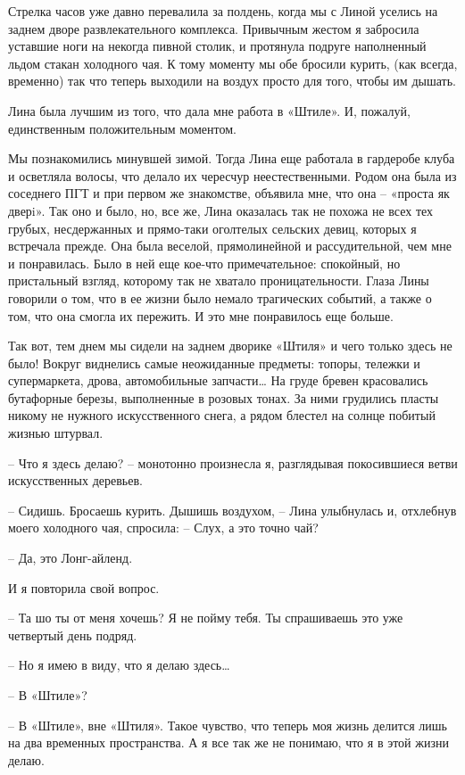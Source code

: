 \documentclass[
]{book}
\begin{document}
Стрелка часов уже давно перевалила за полдень, когда мы с Линой уселись на заднем дворе развлекательного комплекса. Привычным жестом я забросила уставшие ноги на некогда пивной столик, и протянула подруге наполненный льдом стакан холодного чая. К тому моменту мы обе бросили курить, (как всегда, временно) так что теперь выходили на воздух просто для того, чтобы им дышать.

Лина была лучшим из того, что дала мне работа в «Штиле». И, пожалуй, единственным положительным моментом.

Мы познакомились минувшей зимой. Тогда Лина еще работала в гардеробе клуба и осветляла волосы, что делало их чересчур неестественными. Родом она была из соседнего ПГТ и при первом же знакомстве, объявила мне, что она -- «проста як дверi». Так оно и было, но, все же, Лина оказалась так не похожа не всех тех грубых, несдержанных и прямо-таки оголтелых сельских девиц, которых я встречала прежде. Она была веселой, прямолинейной и рассудительной, чем мне и понравилась. Было в ней еще кое-что примечательное: спокойный, но пристальный взгляд, которому так не хватало проницательности. Глаза Лины говорили о том, что в ее жизни было немало трагических событий, а также о том, что она смогла их пережить. И это мне понравилось еще больше.

Так вот, тем днем мы сидели на заднем дворике «Штиля» и чего только здесь не было! Вокруг виднелись самые неожиданные предметы: топоры, тележки и супермаркета, дрова, автомобильные запчасти\ldots{} На груде бревен красовались бутафорные березы, выполненные в розовых тонах. За ними грудились пласты никому не нужного искусственного снега, а рядом блестел на солнце побитый жизнью штурвал.

-- Что я здесь делаю? -- монотонно произнесла я, разглядывая покосившиеся ветви искусственных деревьев.

-- Сидишь. Бросаешь курить. Дышишь воздухом, -- Лина улыбнулась и, отхлебнув моего холодного чая, спросила: -- Слух, а это точно чай?

-- Да, это Лонг-айленд.

И я повторила свой вопрос.

-- Та шо ты от меня хочешь? Я не пойму тебя. Ты спрашиваешь это уже четвертый день подряд.

-- Но я имею в виду, что я делаю здесь\ldots{}

-- В «Штиле»?

-- В «Штиле», вне «Штиля». Такое чувство, что теперь моя жизнь делится лишь на два временных пространства. А я все так же не понимаю, что я в этой жизни делаю.
\end{document}

